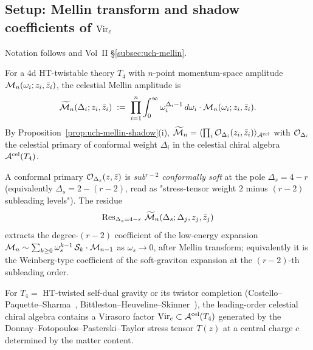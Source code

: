 \subsection{Setup: Mellin transform and shadow coefficients of $\mathrm{Vir}_c$}
\label{subsec:smsb-setup}

Notation follows
\cite{PasterskiShaoStromingerFlatSpaceHolog,StromingerLectures2018,
HamadaShiuSubsubSoft,LiStromingerHigherSoft} and Vol~II
\S\ref{subsec:uch-mellin}.

\begin{definition}
\label{def:smsb-celestial-mellin}
\ClaimStatusProvedElsewhere
For a $4$d HT-twistable theory $T_4$ with $n$-point momentum-space
amplitude $\mathcal M_n(\omega_i; z_i, \bar z_i)$, the celestial Mellin
amplitude is
\[
 \widetilde{\mathcal M}_n(\Delta_i; z_i, \bar z_i)
 \;:=\;
 \prod_{i=1}^n \int_0^\infty \omega_i^{\Delta_i - 1}\, d\omega_i\cdot
 \mathcal M_n(\omega_i; z_i, \bar z_i).
\]
By Proposition~\ref{prop:uch-mellin-shadow}(i),
$\widetilde{\mathcal M}_n = \langle \prod_i \mathcal O_{\Delta_i}(z_i, \bar z_i)
\rangle_{\mathcal A^{\mathrm{cel}}}$ with $\mathcal O_{\Delta_i}$ the celestial primary
of conformal weight $\Delta_i$ in the celestial chiral algebra
$\mathcal A^{\mathrm{cel}}(T_4)$.
\end{definition}

\begin{definition}
\label{def:smsb-soft-pole}
\ClaimStatusProvedElsewhere
A conformal primary $\mathcal O_{\Delta_s}(z, \bar z)$ is \emph{sub${}^{r-2}$
conformally soft} at the pole $\Delta_s = 4 - r$ (equivalently
$\Delta_s = 2 - (r - 2)$, read as "stress-tensor weight $2$ minus
$(r - 2)$ subleading levels"). The residue
\[
 \operatorname{Res}_{\Delta_s = 4 - r}\,
 \widetilde{\mathcal M}_n(\Delta_s; \Delta_j, z_j, \bar z_j)
\]
extracts the degree-$(r - 2)$ coefficient of the low-energy expansion
$\mathcal M_n \sim \sum_{k \geq 0} \omega_s^{k - 1}\, \mathcal S_k \cdot \mathcal M_{n-1}$ as
$\omega_s \to 0$, after Mellin transform; equivalently it is the
Weinberg-type coefficient of the soft-graviton expansion at the
$(r - 2)$-th subleading order.
\end{definition}

\begin{proposition}
\label{prop:smsb-vir-as-cel}
\ClaimStatusProvedElsewhere
For $T_4 = $ HT-twisted self-dual gravity or its twistor completion
(Costello--Paquette--Sharma~\cite{CostelloPaquetteSharmaCelestial},
Bittleston--Heuveline--Skinner~\cite{BittlestonHeuvelineSkinner}), the
leading-order celestial chiral algebra contains a Virasoro factor
$\mathrm{Vir}_c \subset \mathcal A^{\mathrm{cel}}(T_4)$ generated by the
Donnay--Fotopoulos--Pasterski--Taylor
stress tensor $T(z)$ at a central charge $c$ determined by the matter
content.
\end{proposition}

